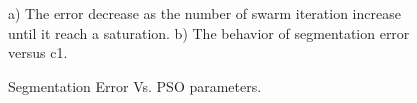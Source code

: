 \documentclass[preprint,10pt,5p,twocolumn]{elsarticle}
\begin{document}
 \begin{figure}
	\centering		
  
		
		
		
	 	\caption{Segmentation Error Vs. PSO parameters.}a) The error decrease as the number of swarm iteration increase until it reach a saturation.   b) The behavior of segmentation error versus c1. 
	 
 	
\end{figure} 
\end{document}
